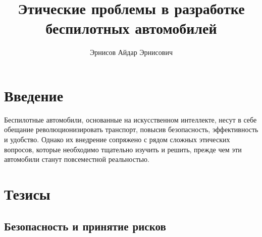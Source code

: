 \documentclass{article}
\begin{document}
\title{Этические проблемы в разработке беспилотных автомобилей}

\author{Эрнисов Айдар Эрнисович}
\maketitle

\section{Введение}

Беспилотные автомобили, основанные на искусственном интеллекте, несут в себе обещание революционизировать транспорт, повысив безопасность, эффективность и удобство. Однако их внедрение сопряжено с рядом сложных этических вопросов, которые необходимо тщательно изучить и решить, прежде чем эти автомобили станут повсеместной реальностью.

\section{Тезисы}

\subsection{Безопасность и принятие рисков}
\end{document}
